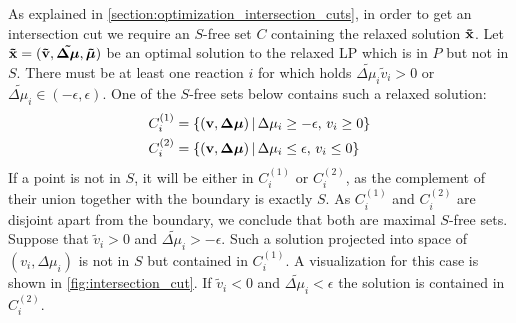 As explained in \cref{section:optimization_intersection_cuts}, in order to get an intersection cut we require an $S$-free set $C$ containing the relaxed solution $\bold{\tilde x}$. Let $\bold{\tilde x} = (\bold{\tilde v}, \boldsymbol{\tilde{\Delta \mu}}, \boldsymbol{\tilde \mu})$ be an optimal solution to the relaxed LP which is in $P$ but not in $S$. There must be at least one reaction $i$ for which holds $\tilde{\Delta \mu_i} \tilde v_i > 0$ or $\tilde{\Delta \mu_i} \in (- \epsilon, \epsilon)$. One of the $S$-free sets below contains such a relaxed solution:
\begin{align*}
    C_i^{(1)} &= \{(\bold v, \boldsymbol{\Delta\mu}) \, | \, \Delta \mu_i \geq - \epsilon, \, v_i \geq 0\} \\
    C_i^{(2)} &= \{(\bold v, \boldsymbol{\Delta\mu}) \, | \, \Delta \mu_i \leq \epsilon, \, v_i \leq 0\} %
\end{align*}
If a point is not in $S$, it will be either in $C_i^{(1)}$ or $C_i^{(2)}$, as the complement of their union together with the boundary is exactly $S$. As $C_i^{(1)}$ and $C_i^{(2)}$ are disjoint apart from the boundary, we conclude that both are maximal $S$-free sets. 
Suppose that $\tilde v_i > 0$ and $\tilde{\Delta \mu_i} > -\epsilon$. Such a solution projected into space of $(v_i, \Delta \mu_i)$ is not in $S$ but contained in $C_i^{(1)}$. A visualization for this case is shown in \cref{fig:intersection_cut}. If $\tilde v_i < 0$ and $\tilde{\Delta \mu_i} < \epsilon$ the solution is contained in $C_i^{(2)}$.

